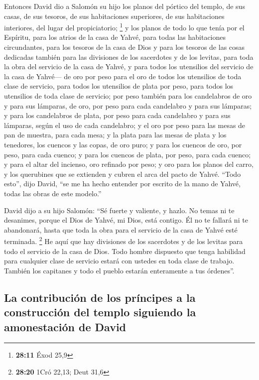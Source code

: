  Entonces David dio a Salomón su hijo los planos del
pórtico del templo, de sus casas, de sus tesoros, de sus habitaciones
superiores, de sus habitaciones interiores, del lugar del propiciatorio;
\footnote{\textbf{28:11} Éxod 25,9}  y los planos de todo
lo que tenía por el Espíritu, para los atrios de la casa de Yahvé, para
todas las habitaciones circundantes, para los tesoros de la casa de Dios
y para los tesoros de las cosas dedicadas  también para
las divisiones de los sacerdotes y de los levitas, para toda la obra del
servicio de la casa de Yahvé, y para todos los utensilios del servicio
de la casa de Yahvé---  de oro por peso para el oro de
todos los utensilios de toda clase de servicio, para todos los
utensilios de plata por peso, para todos los utensilios de toda clase de
servicio;  por peso también para los candelabros de oro y
para sus lámparas, de oro, por peso para cada candelabro y para sus
lámparas; y para los candelabros de plata, por peso para cada candelabro
y para sus lámparas, según el uso de cada candelabro;  y
el oro por peso para las mesas de pan de muestra, para cada mesa; y la
plata para las mesas de plata  y los tenedores, los
cuencos y las copas, de oro puro; y para los cuencos de oro, por peso,
para cada cuenco; y para los cuencos de plata, por peso, para cada
cuenco;  y para el altar del incienso, oro refinado por
peso; y oro para los planos del carro, y los querubines que se extienden
y cubren el arca del pacto de Yahvé.  ``Todo esto'', dijo
David, ``se me ha hecho entender por escrito de la mano de Yahvé, todas
las obras de este modelo.''

 David dijo a su hijo Salomón: ``Sé fuerte y valiente, y
hazlo. No temas ni te desanimes, porque el Dios de Yahvé, mi Dios, está
contigo. Él no te fallará ni te abandonará, hasta que toda la obra para
el servicio de la casa de Yahvé esté terminada. \footnote{\textbf{28:20}
  1Cró 22,13; Deut 31,6}  He aquí que hay divisiones de
los sacerdotes y de los levitas para todo el servicio de la casa de
Dios. Todo hombre dispuesto que tenga habilidad para cualquier clase de
servicio estará con ustedes en toda clase de trabajo. También los
capitanes y todo el pueblo estarán enteramente a tus órdenes''.

\hypertarget{la-contribuciuxf3n-de-los-pruxedncipes-a-la-construcciuxf3n-del-templo-siguiendo-la-amonestaciuxf3n-de-david}{%
\subsection{La contribución de los príncipes a la construcción del
templo siguiendo la amonestación de
David}\label{la-contribuciuxf3n-de-los-pruxedncipes-a-la-construcciuxf3n-del-templo-siguiendo-la-amonestaciuxf3n-de-david}}

